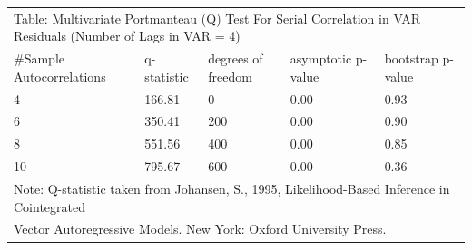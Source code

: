 \documentclass{article}
\begin{document}
 \begin{tabular}{lllll} 
 \multicolumn{5}{l}{Table: Multivariate Portmanteau (Q) Test For Serial 
     Correlation in VAR Residuals (Number of Lags in VAR =  4)} \\ 
 \#Sample Autocorrelations & q-statistic & degrees of freedom & asymptotic 
     p-value & bootstrap p-value \\ 
   4   & 166.81 &   0 & 0.00 & 0.93 \\  
   6   & 350.41 & 200 & 0.00 & 0.90 \\  
   8   & 551.56 & 400 & 0.00 & 0.85 \\  
  10   & 795.67 & 600 & 0.00 & 0.36 \\ 
 \multicolumn{5}{l}{Note: Q-statistic taken from Johansen, S., 1995, 
 Likelihood-Based Inference in Cointegrated } \\  
 \multicolumn{5}{l}{Vector Autoregressive Models. New York: Oxford University 
 Press.} 
   \end{tabular} 
\end{document}

